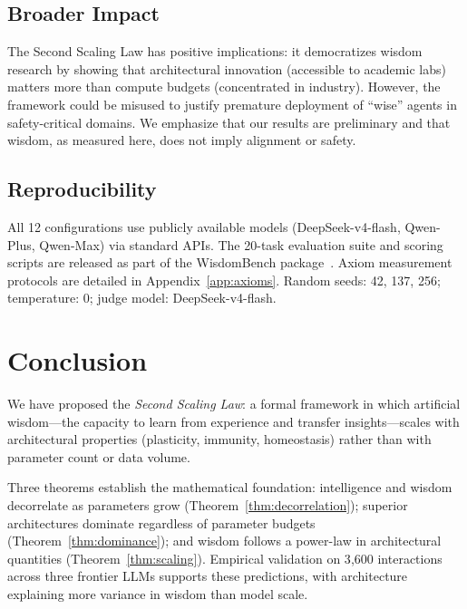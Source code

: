 \documentclass{article}
\begin{document}
\subsection{Broader Impact}

The Second Scaling Law has positive implications: it democratizes wisdom research by showing that architectural innovation (accessible to academic labs) matters more than compute budgets (concentrated in industry).  However, the framework could be misused to justify premature deployment of ``wise'' agents in safety-critical domains.  We emphasize that our results are preliminary and that wisdom, as measured here, does not imply alignment or safety.

\subsection{Reproducibility}

All 12 configurations use publicly available models (DeepSeek-v4-flash, Qwen-Plus, Qwen-Max) via standard APIs.  The 20-task evaluation suite and scoring scripts are released as part of the WisdomBench package~\citep{anon2026p2}.  Axiom measurement protocols are detailed in Appendix~\ref{app:axioms}.  Random seeds: 42, 137, 256; temperature: 0; judge model: DeepSeek-v4-flash.

\section{Conclusion}
\label{sec:conclusion}

We have proposed the \emph{Second Scaling Law}: a formal framework in which artificial wisdom---the capacity to learn from experience and transfer insights---scales with architectural properties (plasticity, immunity, homeostasis) rather than with parameter count or data volume.

Three theorems establish the mathematical foundation: intelligence and wisdom decorrelate as parameters grow (Theorem~\ref{thm:decorrelation}); superior architectures dominate regardless of parameter budgets (Theorem~\ref{thm:dominance}); and wisdom follows a power-law in architectural quantities (Theorem~\ref{thm:scaling}).
Empirical validation on 3{,}600 interactions across three frontier LLMs supports these predictions, with architecture explaining more variance in wisdom than model scale.
\end{document}

